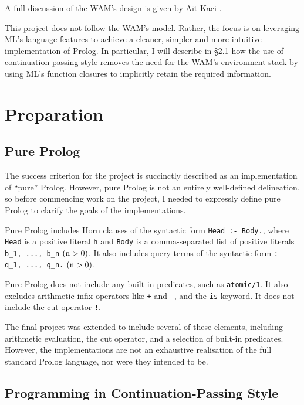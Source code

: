 \documentclass[12pt]{article}
\begin{document}
A full discussion of the WAM's design is given by A\"it-Kaci \cite{wam91}.

This project does not follow the WAM's model. 
Rather, the focus is on leveraging ML's language features to achieve a cleaner, simpler and more intuitive implementation of Prolog. 
In particular, I will describe in \S2.1 how the use of continuation-passing style removes the need for the WAM's environment stack by using ML's function closures to implicitly retain the required information.

\newpage

\section{Preparation}


\subsection{Pure Prolog}

The success criterion for the project is succinctly described as an implementation of ``pure'' Prolog. 
However, pure Prolog is not an entirely well-defined delineation, so before commencing work on the project, I needed to expressly define pure Prolog to clarify the goals of the implementations.

Pure Prolog includes Horn clauses of the syntactic form \verb|Head :- Body.|, where \verb|Head| is a positive literal \verb|h| and \verb|Body| is a comma-separated list of positive literals \verb|b_1, ..., b_n| $(\verb|n| > 0)$. 
It also includes query terms of the syntactic form \verb|:- q_1, ..., q_n.| $(\verb|n| > 0)$.

Pure Prolog does not include any built-in predicates, such as \verb|atomic/1|. 
It also excludes arithmetic infix operators like \verb|+| and \verb|-|, and the \verb|is| keyword. 
It does not include the cut operator \verb|!|.

The final project was extended to include several of these elements, including arithmetic evaluation, the cut operator, and a selection of built-in predicates.
However, the implementations are not an exhaustive realisation of the full standard Prolog language, nor were they intended to be.

\subsection{Programming in Continuation-Passing Style}
\end{document}
